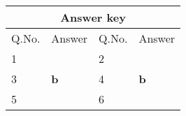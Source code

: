 \setlength\arrayrulewidth{1pt}
\begin{table}[H]
	\centering
	\begin{tabular}{|p{1.5cm}|p{1.5cm}||p{1.5cm}|p{1.5cm}|}
		\hline
		\multicolumn{4}{|c|}{\textbf{Answer key}}\\\hline\hline
		\rowcolor{ocrel}Q.No.&Answer&Q.No.&Answer\\\hline
		1&\textbf{} &2&\textbf{}\\\hline 
		3&\textbf{b} &4&\textbf{b} \\\hline
		5&\textbf{} &6&\textbf{} \\\hline
		
	\end{tabular}
\end{table}















